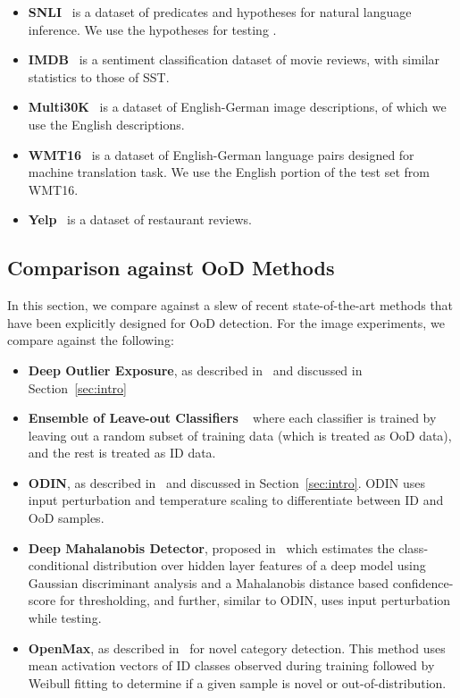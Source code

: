 \documentclass[accepted]{uai2021} \pdfoutput=1
\begin{document}
\begin{itemize}
	\item \textbf{SNLI}~\cite{snli} is a dataset of predicates and hypotheses for natural language inference. We use the hypotheses for testing .
	
	\item \textbf{IMDB}~\cite{imdb} is a sentiment classification dataset of movie reviews, with similar statistics to those of SST.
	
	\item \textbf{Multi30K}~\cite{multi30k} is a dataset of English-German image descriptions, of which we use the English descriptions.
	
	\item\textbf{WMT16}~\cite{wmt16} is a dataset of English-German language pairs designed for machine translation task. We use the English portion of the test set from WMT16.
	
	\item \textbf{Yelp}~\cite{yelp} is a dataset of restaurant reviews.
\end{itemize}


\subsection{Comparison against OoD Methods}

In this section, we compare against a slew of recent state-of-the-art methods that have been explicitly designed for OoD detection. For the image experiments,  we compare against the following:

\begin{itemize}
	
	\item \textbf{Deep Outlier Exposure}, as described in~\cite{hendrycks2018deep} and discussed in Section~\ref{sec:intro}
	
	\item \textbf{Ensemble of Leave-out Classifiers} ~\cite{vyas2018out} where each classifier is trained by leaving out a random subset of training data (which is treated as OoD data), and the rest is treated as ID data.
	
	\item \textbf{ODIN}, as described in~\cite{liangenhancing} and discussed in Section~\ref{sec:intro}. ODIN uses input perturbation and temperature scaling to differentiate between ID and OoD samples. 

	\item \textbf{Deep Mahalanobis Detector}, proposed in~\cite{lee2018simple} which estimates the class-conditional distribution over hidden layer features of a deep model using Gaussian discriminant analysis and a Mahalanobis distance based confidence-score for thresholding, and further, similar to ODIN, uses input perturbation while testing.
	
	\item \textbf{OpenMax}, as described in~\cite{bendale2016towards} for novel category detection. This method uses mean activation vectors of ID classes observed during training followed by Weibull fitting to determine if a given sample is novel or out-of-distribution.
\end{itemize}
\end{document}
